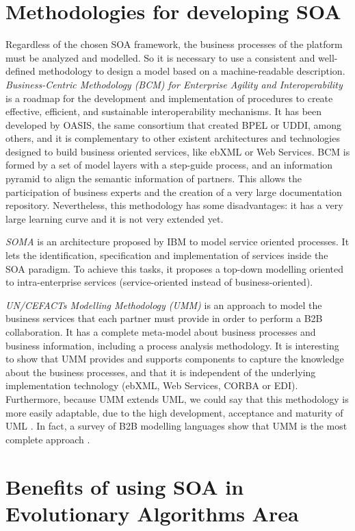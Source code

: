 \section{Methodologies for developing SOA}
Regardless of the chosen SOA framework, the business processes of the platform must be analyzed and modelled. So it is necessary to use a consistent and well-defined methodology to design a model based on a machine-readable description. {\em Business-Centric Methodology (BCM) for Enterprise Agility and Interoperability} \cite{Oasis03BCM} is a roadmap for the development and implementation of procedures to create effective, efficient, and sustainable interoperability mechanisms. It has been developed by OASIS, the same consortium that created BPEL or UDDI, among others, and it is complementary to other existent architectures and technologies designed to build business oriented services, like ebXML or Web Services. BCM is formed by a set of model layers with a step-guide process, and an information pyramid to align the semantic information of partners. This allows the participation of business experts and the creation of a very large documentation repository. Nevertheless, this methodology has some disadvantages: it has a very large learning curve and it is not very extended yet. 

{\em SOMA} \cite{Arsanjani2008SOMA} is an architecture proposed by IBM to model service oriented processes. It lets the identification, specification and implementation of services inside the SOA paradigm. To achieve this tasks, it proposes a top-down modelling oriented to intra-enterprise services (service-oriented instead of business-oriented).

{\em UN/CEFACTs Modelling Methodology (UMM)} \cite{Hofreiter06UMM} is an approach to model the business services that each partner must provide in order to perform a B2B collaboration. It has a complete meta-model about business processes and business information, including a process analysis methodology. It is interesting to show that UMM provides and supports components to capture the knowledge about the business processes, and that it is independent of the underlying implementation technology (ebXML, Web Services, CORBA or EDI). Furthermore, because UMM extends UML, we could say that this methodology is more easily adaptable, due to the high development, acceptance and maturity of UML \cite{Garcia09UMM}. In fact, a survey of B2B modelling languages show that UMM is the most complete approach \cite{Folmer08b2b}.

\section{Benefits of using SOA in Evolutionary Algorithms Area}

